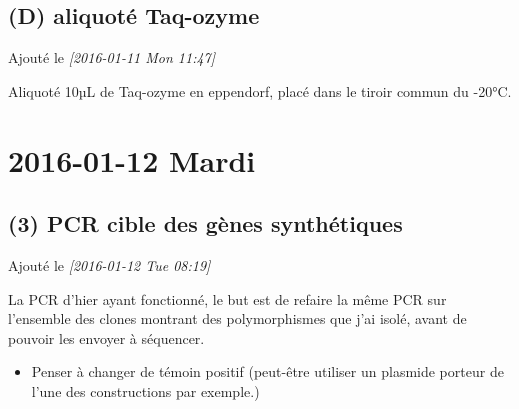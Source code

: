 \documentclass[9pt, oneside, twocolumn]{scrartcl}
\begin{document}
\subsection{(D) aliquoté Taq-ozyme}
\label{sec:orgheadline5}
Ajouté le \textit{[2016-01-11 Mon 11:47]}

Aliquoté 10µL de Taq-ozyme en eppendorf, placé dans le tiroir commun du -20°C.

\section{2016-01-12 Mardi}
\label{sec:orgheadline18}
\subsection{(3) PCR cible des gènes synthétiques}
\label{sec:orgheadline10}
Ajouté le \textit{[2016-01-12 Tue 08:19]}

La PCR d'hier ayant fonctionné, le but est de refaire la même PCR sur l'ensemble
des clones montrant des polymorphismes que j'ai isolé, avant de pouvoir les
envoyer à séquencer.

\begin{itemize}
\item Penser à changer de témoin positif (peut-être utiliser un plasmide porteur de
l'une des constructions par exemple.)
\end{itemize}
\end{document}
